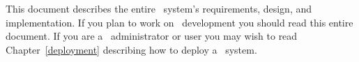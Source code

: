 This document describes the entire \VTank\ system's requirements, design, and implementation. If you plan to work on \VTank\ development you should read this entire document. If you are a \VTank\ administrator or user you may wish to read Chapter~\ref{deployment} describing how to deploy a \VTank\ system.
